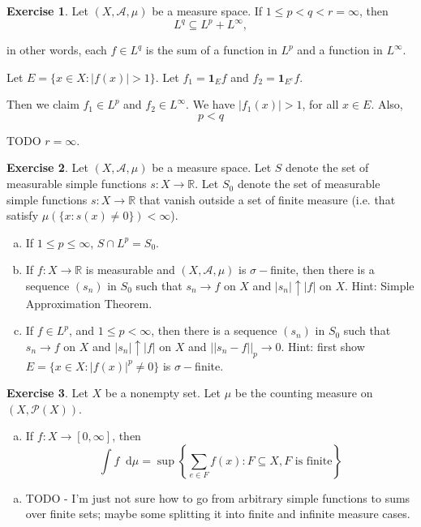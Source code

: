 \documentclass[11pt,oneside]{article}
\numberwithin{equation}{section}
\theoremstyle{definition}
\newtheorem{exercise}{Exercise}
\def\RR{\mathbb{R}}
\def\fancyA{\mathscr{A}}
\def\fancyP{\mathscr{P}}
\newcommand*\diff{\mathop{}\!\mathrm{d}}
\def\one{\mathbf{1}}
\begin{document}
\begin{exercise}
  Let $(X, \fancyA, \mu) $ be a measure space.  If $1 \leq p < q < r = \infty$, then
  \[
  L^q \subseteq L^p + L^\infty,
  \]

  in other words, each $f \in L^q$ is the sum of a function in $L^p$ and a function in $L^\infty$. 
\end{exercise}
\begin{solution}
  Let $E = \{ x \in X : | f(x) | > 1 \}$.  Let $f_1 = \one_E f$ and $f_2 = \one_{E^c} f$.

  Then we claim $f_1 \in L^p$ and $f_2 \in L^\infty$.  We have $|f_1(x)| > 1$, for all $x \in E$.  Also, 
  \[
  p < q
  \]

  TODO $r = \infty$.  
\end{solution}

\begin{exercise}
  Let $(X, \fancyA, \mu )$ be a measure space.  Let $S$ denote the set of measurable simple functions $s : X \to \RR$.  Let
  $S_0$ denote the set of measurable simple functions $s : X \to \RR$ that vanish outside a set of
  finite measure (i.e. that satisfy $\mu (\{ x: s(x) \neq 0\}) < \infty$).  
\begin{enumerate}[(a)]
\item
  If $1 \leq p \leq \infty$, $S \cap L^p = S_0$.
\item
  If $f : X \to \RR$ is measurable and $(X, \fancyA, \mu)$ is
  $\sigma-$finite, then there is a sequence $(s_n)$ in $S_0$ such that
  $s_n \to f$ on $X$ and $|s_n|\uparrow |f|$ on $X$.  Hint: Simple Approximation Theorem.
\item
  If $f \in L^p$, and $1 \leq p < \infty$, then there is a sequence $(s_n)$ in $S_0$ such that
  $s_n \to f$ on $X$ and $ |s_n| \uparrow |f|$ on $X$ and $|| s_n - f||_p \to 0$. Hint:
  first show $E = \{ x \in X: | f(x)| ^p \neq 0 \}$ is $\sigma-$finite.  
\end{enumerate}
  
\end{exercise}

\begin{exercise}
  Let $X$ be a nonempty set.  Let $\mu$ be the counting measure on $(X, \fancyP(X))$. 
  \begin{enumerate}[(a)]
  \item
    If $f: X \to [0, \infty]$, then
\[
\int f \diff{\mu} = \sup \left\{ \sum _ {e \in F} f(x) : F \subseteq X, F \textrm{ is finite} \right\}
\]
  \end{enumerate}
\end{exercise}
\begin{solution}
\begin{enumerate}[(a)]
\item
  TODO - I'm just not sure how to go from arbitrary simple functions to sums over finite sets; maybe some splitting it  into finite and infinite measure cases. 

\end{enumerate}
\end{solution}
\end{document}
